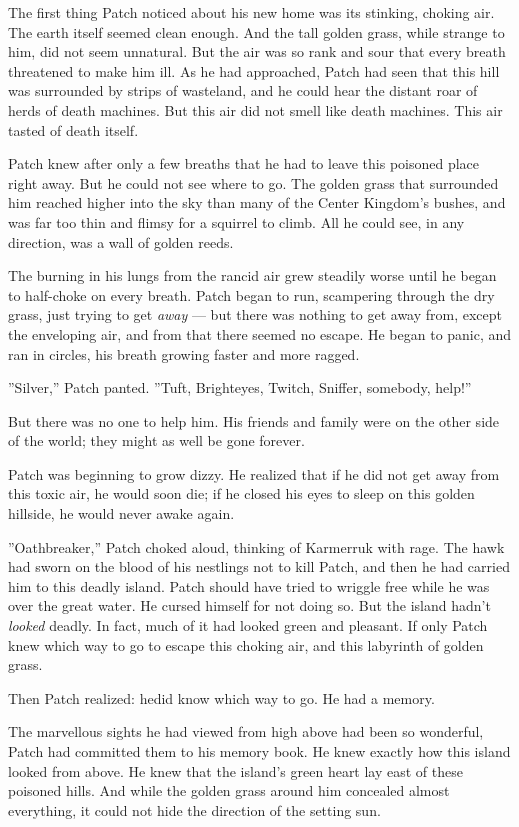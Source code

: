 \documentclass[12pt]{book}
\begin{document}
The first thing Patch noticed about his new home was its stinking, choking air. The earth itself seemed clean enough. And the tall golden grass, while strange to him, did not seem unnatural. But the air was so rank and sour that every breath threatened to make him ill. As he had approached, Patch had seen that this hill was surrounded by strips of wasteland, and he could hear the distant roar of herds of death machines. But this air did not smell like death machines. This air tasted of death itself.

Patch knew after only a few breaths that he had to leave this poisoned place right away. But he could not see where to go. The golden grass that surrounded him reached higher into the sky than many of the Center Kingdom's bushes, and was far too thin and flimsy for a squirrel to climb. All he could see, in any direction, was a wall of golden reeds. 

The burning in his lungs from the rancid air grew steadily worse until he began to half-choke on every breath. Patch began to run, scampering through the dry grass, just trying to get {\it away} ---
but there was nothing to get away from, except the enveloping air, and from that there seemed no escape. He began to panic, and ran in circles, his breath growing faster and more ragged. 

''Silver,'' Patch panted. ''Tuft, Brighteyes, Twitch, Sniffer, somebody, help!''

But there was no one to help him. His friends and family were on the other side of the world; they might as well be gone forever.

Patch was beginning to grow dizzy. He realized that if he did not get away from this toxic air, he would soon die; if he closed his eyes to sleep on this golden hillside, he would never awake again.

''Oathbreaker,'' Patch choked aloud, thinking of Karmerruk with rage. The hawk had sworn on the blood of his nestlings not to kill Patch, and then he had carried him to this deadly island. Patch should have tried to wriggle free while he was over the great water. He cursed himself for not doing so. But the island hadn't {\it looked} deadly. In fact, much of it had looked green and pleasant. If only Patch knew which way to go to escape this choking air, and this labyrinth of golden grass.

Then Patch realized: he{\it  }did know which way to go. He had a memory.

The marvellous sights he had viewed from high above had been so wonderful, Patch had committed them to his memory book. He knew exactly how this island looked from above. He knew that the island's green heart lay east of these poisoned hills. And while the golden grass around him concealed almost everything, it could not hide the direction of the setting sun.
\end{document}
